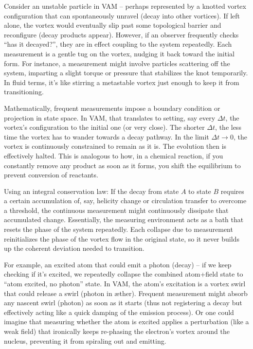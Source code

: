 \documentclass[a4paper, aps,preprint,superscriptaddress, 12pt]{revtex4}
\begin{document}
Consider an unstable particle in VAM – perhaps represented by a knotted vortex configuration that can spontaneously unravel (decay into other vortices). If left alone, the vortex would eventually slip past some topological barrier and reconfigure (decay products appear). However, if an observer frequently checks “has it decayed?”, they are in effect coupling to the system repeatedly. Each measurement is a gentle tug on the vortex, nudging it back toward the initial form. For instance, a measurement might involve particles scattering off the system, imparting a slight torque or pressure that stabilizes the knot temporarily. In fluid terms, it’s like stirring a metastable vortex just enough to keep it from transitioning.


Mathematically, frequent measurements impose a boundary condition or projection in state space. In VAM, that translates to setting, say every $\Delta t$, the vortex’s configuration to the initial one (or very close). The shorter $\Delta t$, the less time the vortex has to wander towards a decay pathway. In the limit $\Delta t \to 0$, the vortex is continuously constrained to remain as it is. The evolution then is effectively halted. This is analogous to how, in a chemical reaction, if you constantly remove any product as soon as it forms, you shift the equilibrium to prevent conversion of reactants.


Using an integral conservation law: If the decay from state $A$ to state $B$ requires a certain accumulation of, say, helicity change or circulation transfer to overcome a threshold, the continuous measurement might continuously dissipate that accumulated change. Essentially, the measuring environment acts as a bath that resets the phase of the system repeatedly. Each collapse due to measurement reinitializes the phase of the vortex flow in the original state, so it never builds up the coherent deviation needed to transition.


For example, an excited atom that could emit a photon (decay) – if we keep checking if it’s excited, we repeatedly collapse the combined atom+field state to “atom excited, no photon” state. In VAM, the atom’s excitation is a vortex swirl that could release a swirl (photon in æther). Frequent measurement might absorb any nascent swirl (photon) as soon as it starts (thus not registering a decay but effectively acting like a quick damping of the emission process). Or one could imagine that measuring whether the atom is excited applies a perturbation (like a weak field) that ironically keeps re-phasing the electron’s vortex around the nucleus, preventing it from spiraling out and emitting.
\end{document}
